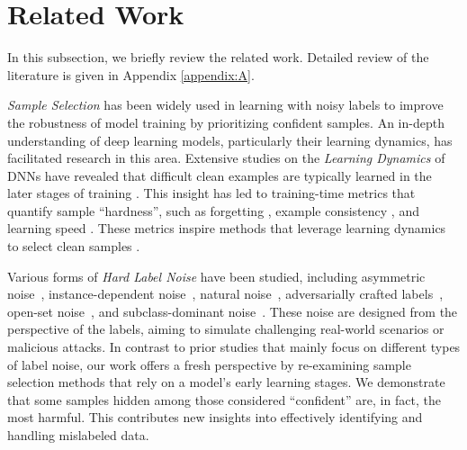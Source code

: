 \section{Related Work}
In this subsection, we briefly review the related work. Detailed review of the literature is given in Appendix \ref{appendix:A}.

\emph{Sample Selection} has been widely used in learning with noisy labels to improve the robustness of model training by prioritizing confident samples. An in-depth understanding of deep learning models, particularly their learning dynamics, has facilitated research in this area. Extensive studies on the \emph{Learning Dynamics} of DNNs have revealed that difficult clean examples are typically learned in the later stages of training \cite{arpit2017closer, toneva2018empirical, yuan2024early}. This insight has led to training-time metrics that quantify sample ``hardness'', such as forgetting \cite{toneva2018empirical}, example consistency \cite{pleiss2020identifying}, and learning speed \cite{jiang2021characterizing}. These metrics inspire methods that leverage learning dynamics to select clean samples \cite{zhou2021robust, maini2022characterizing}.

Various forms of \emph{Hard Label Noise} have been studied, including asymmetric noise~\citep{scott2013classification}, instance-dependent noise~\citep{xia2020part}, natural noise~\citep{wei2021learning}, adversarially crafted labels~\citep{zhang2024badlabel}, open-set noise~\citep{wei2021open}, and subclass-dominant noise~\cite{bai2023subclassdominant}. These noise are designed from the perspective of the labels, aiming to simulate challenging real-world scenarios or malicious attacks. 
In contrast to prior studies that mainly focus on different types of label noise, our work offers a fresh perspective by re-examining sample selection methods that rely on a model's early learning stages. We demonstrate that some samples hidden among those considered ``confident'' are, in fact, the most harmful. This contributes new insights into effectively identifying and handling mislabeled data.